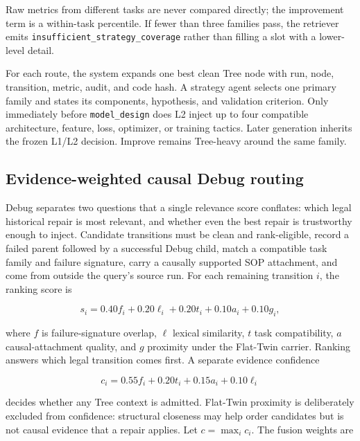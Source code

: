 \documentclass{article}
\begin{document}
Raw metrics from different tasks are never compared directly; the improvement
term is a within-task percentile.  If fewer than three families pass, the
retriever emits \texttt{insufficient\_strategy\_coverage} rather than filling a
slot with a lower-level detail.

For each route, the system expands one best clean Tree node with run, node,
transition, metric, audit, and code hash.  A strategy agent selects one primary
family and states its components, hypothesis, and validation criterion.  Only
immediately before \texttt{model\_design} does L2 inject up to four compatible
architecture, feature, loss, optimizer, or training tactics.  Later generation
inherits the frozen L1/L2 decision.  Improve remains Tree-heavy around the same
family.

\subsection{Evidence-weighted causal Debug routing}

Debug separates two questions that a single relevance score conflates: which
legal historical repair is most relevant, and whether even the best repair is
trustworthy enough to inject.  Candidate transitions must be clean and
rank-eligible, record a failed parent followed by a successful Debug child,
match a compatible task family and failure signature, carry a causally supported
SOP attachment, and come from outside the query's source run.  For each remaining
transition $i$, the ranking score is

\begin{equation}
s_i=0.40f_i+0.20\ell_i+0.20t_i+0.10a_i+0.10g_i,
\label{eq:debug-ranking}
\end{equation}

where $f$ is failure-signature overlap, $\ell$ lexical similarity, $t$ task
compatibility, $a$ causal-attachment quality, and $g$ proximity under the
Flat-Twin carrier.  Ranking answers which legal transition comes first.  A
separate evidence confidence

\begin{equation}
c_i=0.55f_i+0.20t_i+0.15a_i+0.10\ell_i
\label{eq:debug-confidence}
\end{equation}

decides whether any Tree context is admitted.  Flat-Twin proximity is
deliberately excluded from confidence: structural closeness may help order
candidates but is not causal evidence that a repair applies.  Let
$c=\max_i c_i$.  The fusion weights are
\end{document}
